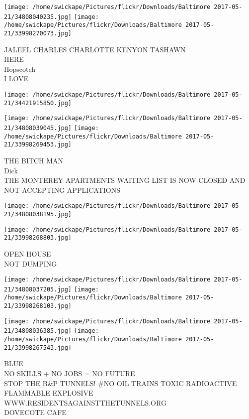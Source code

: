 \documentclass[10pt,letterpaper]{article}
\begin{document}
\texttt{[image: /home/swickape/Pictures/flickr/Downloads/Baltimore 2017-05-21/34808040235.jpg]}
\texttt{[image: /home/swickape/Pictures/flickr/Downloads/Baltimore 2017-05-21/33998270073.jpg]}

JALEEL CHARLES CHARLOTTE KENYON TASHAWN\\
HERE\\
Hopscotch\\
I LOVE\\
\pagebreak

\texttt{[image: /home/swickape/Pictures/flickr/Downloads/Baltimore 2017-05-21/34421915850.jpg]}

\vspace{0.25in}
\texttt{[image: /home/swickape/Pictures/flickr/Downloads/Baltimore 2017-05-21/34808039045.jpg]}
\texttt{[image: /home/swickape/Pictures/flickr/Downloads/Baltimore 2017-05-21/33998269453.jpg]}

THE BITCH MAN\\
Dick\\
THE MONTEREY APARTMENTS WAITING LIST IS NOW CLOSED AND NOT ACCEPTING APPLICATIONS\\
\pagebreak

\texttt{[image: /home/swickape/Pictures/flickr/Downloads/Baltimore 2017-05-21/34808038195.jpg]}

\vspace{0.25in}
\texttt{[image: /home/swickape/Pictures/flickr/Downloads/Baltimore 2017-05-21/33998268803.jpg]}

OPEN HOUSE\\
NOT DUMPING\\
\pagebreak

\texttt{[image: /home/swickape/Pictures/flickr/Downloads/Baltimore 2017-05-21/34808037205.jpg]}
\texttt{[image: /home/swickape/Pictures/flickr/Downloads/Baltimore 2017-05-21/33998268103.jpg]}

\texttt{[image: /home/swickape/Pictures/flickr/Downloads/Baltimore 2017-05-21/34808036385.jpg]}
\texttt{[image: /home/swickape/Pictures/flickr/Downloads/Baltimore 2017-05-21/33998267543.jpg]}

BLUE\\
NO SKILLS + NO JOBS = NO FUTURE\\
STOP THE B\&P TUNNELS!  \#NO OIL TRAINS TOXIC RADIOACTIVE FLAMMABLE EXPLOSIVE WWW.RESIDENTSAGAINSTTHETUNNELS.ORG\\
DOVECOTE CAFE\\
\pagebreak
\end{document}
